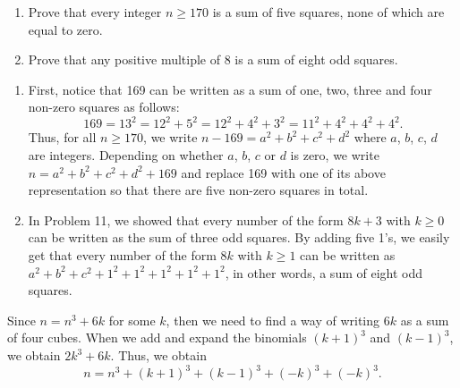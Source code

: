 \begin{exercise}
    \begin{enumerate}
        \item Prove that every integer $n \geq 170$ is a sum of five squares, none of which are equal to zero. 
        \item Prove that any positive multiple of 8 is a sum of eight odd squares.  \\
    \end{enumerate}
\end{exercise}

\begin{solution}
    \begin{enumerate}
        \item First, notice that 169 can be written as a sum of one, two, three and four non-zero squares as follows:
        $$169 = 13^2 = 12^2 + 5^2 = 12^2 + 4^2 + 3^2 = 11^2 + 4^2 + 4^2 + 4^2.$$
        Thus, for all $n \geq 170$, we write $n - 169 = a^2 + b^2 + c^2 + d^2$ where $a$, $b$, $c$, $d$ are integers. Depending on whether $a$, $b$, $c$ or $d$ is zero, we write $n = a^2 + b^2 + c^2 + d^2 + 169$ and replace 169 with one of its above representation so that there are five non-zero squares in total.
        \item In Problem 11, we showed that every number of the form $8k + 3$ with $k \geq 0$ can be written as the sum of three odd squares. By adding five 1's, we easily get that every number of the form $8k$ with $k \geq 1$ can be written as $a^2 + b^2 + c^2 + 1^2 + 1^2 + 1^2 + 1^2 + 1^2$, in other words, a sum of eight odd squares. \\
    \end{enumerate}
\end{solution}


\begin{solution}
    Since $n = n^3 + 6k$ for some $k$, then we need to find a way of writing $6k$ as a sum of four cubes. When we add and expand the binomials $(k+1)^3$ and $(k-1)^3$, we obtain $2k^3 + 6k$. Thus, we obtain
    $$n = n^3 + (k+1)^3 + (k-1)^3 + (-k)^3 + (-k)^3.$$ \\
\end{solution}

